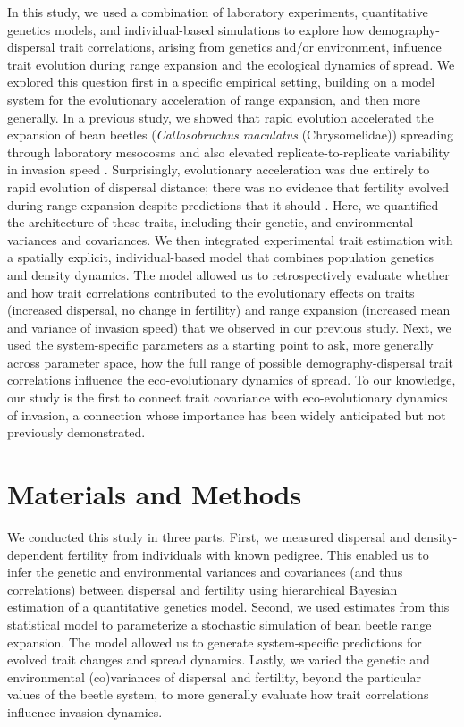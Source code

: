 \documentclass[11pt]{article}
\newcommand{\revise}[1]{{\color{Mahogany}{#1}}}
\begin{document}
In this study, we used a combination of laboratory experiments, quantitative genetics models, and individual-based simulations to explore how demography-dispersal trait correlations, arising from genetics and/or environment, influence trait evolution during range expansion and the ecological dynamics of spread.
We explored this question first in a specific empirical setting, building on a model system for the evolutionary acceleration of range expansion, and then more generally.
In a previous study, we showed that rapid evolution accelerated the expansion of bean beetles (\textit{Callosobruchus maculatus} (Chrysomelidae)) spreading through laboratory mesocosms and also elevated replicate-to-replicate variability in invasion speed \citep{ochocki_rapid_2017}.
Surprisingly, evolutionary acceleration was due entirely to rapid evolution of dispersal distance; there was no evidence that fertility evolved during range expansion despite predictions that it should \citep{ochocki_rapid_2017}.
Here, we quantified the architecture of these traits, including their genetic, \revise{maternal,} and environmental variances and covariances.
We then integrated experimental trait estimation with a spatially explicit, individual-based model that combines population genetics and density dynamics.
The model allowed us to retrospectively evaluate whether and how trait correlations contributed to the evolutionary effects on traits (increased dispersal, no change in fertility) and range expansion (increased mean and variance of invasion speed) that we observed in our previous study.
Next, we used the system-specific parameters as a starting point to ask, more generally across parameter space, how the full range of possible demography-dispersal trait correlations influence the eco-evolutionary dynamics of spread.
To our knowledge, our study is the first to connect trait covariance with  eco-evolutionary dynamics of invasion, a connection whose importance has been widely anticipated \citep{chuang_expanding_2016,phillips_life-history_2010,perkins_evolution_2013} but not previously demonstrated.

\section*{Materials and Methods}

We conducted this study in three parts.
First, we measured dispersal and density-dependent fertility from individuals with known pedigree.
This enabled us to infer the genetic and environmental variances and covariances (and thus correlations) between dispersal and fertility using hierarchical Bayesian estimation of a quantitative genetics model.
Second, we used estimates from this statistical model to parameterize a stochastic simulation of bean beetle range expansion.
The model allowed us to generate system-specific predictions for evolved trait changes and spread dynamics.
Lastly, we varied the genetic and environmental (co)variances of dispersal and fertility, beyond the particular values of the beetle system, to more generally evaluate how trait correlations influence invasion dynamics.
\end{document}
